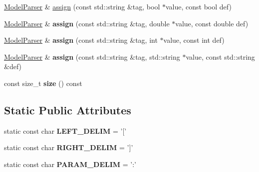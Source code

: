 \begin{DoxyCompactItemize}
\item 
\hyperlink{classModelParser}{Model\-Parser} \& \hyperlink{classModelParser_ac3c7dc0f7484ebd31cf54cc8b9a0c577}{assign} (const std\-::string \&tag, bool $\ast$value, const bool def)
\item 
\hypertarget{classModelParser_a03a38e94224700ff73332930d9d43e4a}{\hyperlink{classModelParser}{Model\-Parser} \& {\bfseries assign} (const std\-::string \&tag, double $\ast$value, const double def)}\label{classModelParser_a03a38e94224700ff73332930d9d43e4a}

\item 
\hypertarget{classModelParser_aeed128d82ced7586870cd293fee36264}{\hyperlink{classModelParser}{Model\-Parser} \& {\bfseries assign} (const std\-::string \&tag, int $\ast$value, const int def)}\label{classModelParser_aeed128d82ced7586870cd293fee36264}

\item 
\hypertarget{classModelParser_aefce479b7f56bfbe74d79110edf01e49}{\hyperlink{classModelParser}{Model\-Parser} \& {\bfseries assign} (const std\-::string \&tag, std\-::string $\ast$value, const std\-::string \&def)}\label{classModelParser_aefce479b7f56bfbe74d79110edf01e49}

\item 
\hypertarget{classModelParser_a7c0cdad1d8b8a7c0aee6c0ae07664363}{const size\-\_\-t {\bfseries size} () const }\label{classModelParser_a7c0cdad1d8b8a7c0aee6c0ae07664363}

\end{DoxyCompactItemize}
\subsection*{Static Public Attributes}
\begin{DoxyCompactItemize}
\item 
\hypertarget{classModelParser_aac2c439ee878395e385046a1f5aafc48}{static const char {\bfseries L\-E\-F\-T\-\_\-\-D\-E\-L\-I\-M} = '\mbox{[}'}\label{classModelParser_aac2c439ee878395e385046a1f5aafc48}

\item 
\hypertarget{classModelParser_a185a34c33b9648946627a5b06ae1a741}{static const char {\bfseries R\-I\-G\-H\-T\-\_\-\-D\-E\-L\-I\-M} = '\mbox{]}'}\label{classModelParser_a185a34c33b9648946627a5b06ae1a741}

\item 
\hypertarget{classModelParser_a1811dec15667074357233d6df7f44939}{static const char {\bfseries P\-A\-R\-A\-M\-\_\-\-D\-E\-L\-I\-M} = '\-:'}\label{classModelParser_a1811dec15667074357233d6df7f44939}

\end{DoxyCompactItemize}


